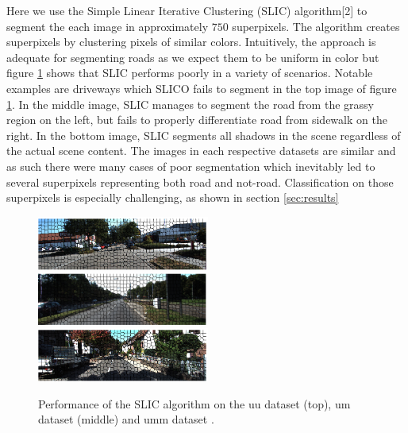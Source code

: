 \documentclass{article} %
\begin{document}
Here we use the Simple Linear Iterative Clustering (SLIC) algorithm[2] to segment the each image in approximately $750$ superpixels. The algorithm creates superpixels by clustering pixels of similar colors. Intuitively, the approach is adequate for segmenting roads as we expect them to be uniform in color but figure \ref{fig:SLIC} shows that SLIC performs poorly in a variety of scenarios. Notable examples are driveways which SLICO fails to segment in the top image  of figure \ref{fig:SLIC}. In the middle image, SLIC manages to segment the road from the grassy region on the left, but fails to properly differentiate road from sidewalk on the right. In the bottom image, SLIC segments all shadows in the scene regardless of the actual scene content. The images in each respective datasets are similar and as such there were many cases of poor segmentation which inevitably led to several superpixels representing both road and not-road. Classification on those superpixels is especially challenging, as shown in section \ref{sec:results}

\begin{figure}[ht!]
\centering \hspace{-1.1pt}
 \includegraphics[width=0.5045\textwidth]{figs/SLICOuu.pdf}\\
 \vspace{-2.2pt}
 \includegraphics[width=0.5\textwidth]{figs/SLICOum.pdf}\\
 \vspace{-4.0pt} \hspace{-1.1pt}
 \includegraphics[width=0.5045\textwidth]{figs/SLICOumm.pdf}\\
 \caption{Performance of the SLIC algorithm on the uu dataset (top), um dataset (middle) and umm dataset .}\label{fig:SLIC}
\end{figure}
\end{document}
